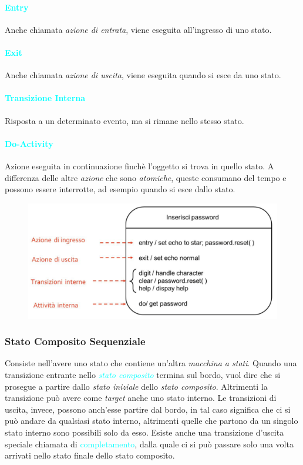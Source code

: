 \paragraph{\textcolor{cyan}{Entry}} Anche chiamata \emph{azione di entrata}, viene eseguita all'ingresso di uno stato.
\paragraph{\textcolor{cyan}{Exit}} Anche chiamata \emph{azione di uscita}, viene eseguita quando si esce da uno stato.
\paragraph{\textcolor{cyan}{Transizione Interna}} Risposta a un determinato evento, ma si rimane nello stesso stato.
\paragraph{\textcolor{cyan}{Do-Activity}} Azione eseguita in continuazione finchè l'oggetto si trova in quello stato.
A differenza delle altre \emph{azione} che sono \emph{atomiche}, queste consumano del tempo e possono essere interrotte, ad esempio
quando si esce dallo stato.

\begin{figure}[h]
    \centering
    \includegraphics[scale=0.37]{img/entry.png}
\end{figure}

\newpage

\subsubsection{Stato Composito Sequenziale}
Consiste nell'avere uno stato che contiene un'altra \emph{macchina a stati}.
Quando una transizione entrante nello \emph{\textcolor{cyan}{stato composito}} termina sul bordo, vuol
dire che si prosegue a partire dallo \emph{stato iniziale} dello \emph{stato composito}. Altrimenti la transizione
può avere come \emph{target} anche uno stato interno.
Le transizioni di uscita, invece, possono anch'esse partire dal bordo, in tal caso
significa che ci si può andare da qualsiasi stato interno, altrimenti quelle che partono da un singolo stato interno
sono possibili solo da esso. Esiste anche una transizione d'uscita speciale chiamata di \textcolor{cyan}{completamento},
dalla quale ci si può passare solo una volta arrivati nello stato finale dello stato composito.

